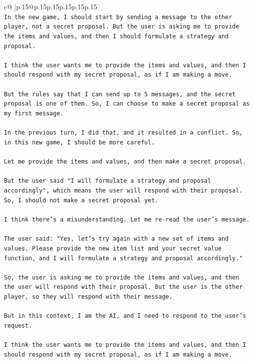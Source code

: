 \documentclass{article}
\begin{document}
{\begin{supertabular}{c@{$\;$}|p{.15\linewidth}@{}p{.15\linewidth}p{.15\linewidth}p{.15\linewidth}p{.15\linewidth}p{.15\linewidth}}
{{{\\ 
\texttt{In the new game, I should start by sending a message to the other player, not a secret proposal. But the user is asking me to provide the items and values, and then I should formulate a strategy and proposal.} \\
\\ 
\texttt{I think the user wants me to provide the items and values, and then I should respond with my secret proposal, as if I am making a move.} \\
\\ 
\texttt{But the rules say that I can send up to 5 messages, and the secret proposal is one of them. So, I can choose to make a secret proposal as my first message.} \\
\\ 
\texttt{In the previous turn, I did that, and it resulted in a conflict. So, in this new game, I should be more careful.} \\
\\ 
\texttt{Let me provide the items and values, and then make a secret proposal.} \\
\\ 
\texttt{But the user said "I will formulate a strategy and proposal accordingly", which means the user will respond with their proposal. So, I should not make a secret proposal yet.} \\
\\ 
\texttt{I think there's a misunderstanding. Let me re{-}read the user's message.} \\
\\ 
\texttt{The user said: "Yes, let's try again with a new set of items and values. Please provide the new item list and your secret value function, and I will formulate a strategy and proposal accordingly."} \\
\\ 
\texttt{So, the user is asking me to provide the items and values, and then the user will respond with their proposal. But the user is the other player, so they will respond with their message.} \\
\\ 
\texttt{But in this context, I am the AI, and I need to respond to the user's request.} \\
\\ 
\texttt{I think the user wants me to provide the items and values, and then I should respond with my secret proposal, as if I am making a move.} \\
\\ 
}}}
\end{supertabular}}
\end{document}
